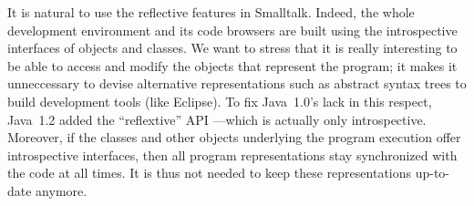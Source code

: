 \documentclass[a4paper,10pt,twoside]{book}
\begin{document}
It is natural to use the reflective features in Smalltalk.
Indeed, the whole development environment and its code browsers are built using the introspective interfaces of objects and classes.
We want to stress that it is really interesting to be able to access and modify the objects that represent the program; it makes it unneccessary to devise alternative representations such as abstract syntax trees to build development tools (like Eclipse).
To fix Java~1.0's lack in this respect, Java~1.2 added the ``reflextive'' API ---which is actually only introspective.
Moreover, if the classes and other objects underlying the program execution offer introspective interfaces, then all program representations stay synchronized with the code at all times.
It is thus not needed to keep these representations up-to-date anymore.



\ifx\wholebook\relax\else
\end{document}
